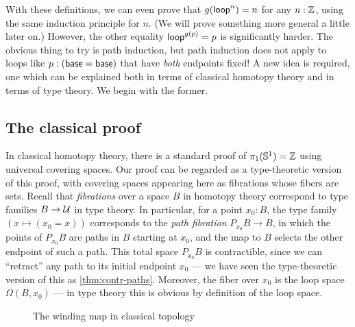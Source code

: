 With these definitions, we can even prove that $g(\mathsf{loop}^n)=n$ for any $n:\mathbb{Z}$, using the same induction principle for $n$.
(We will prove something more general a little later on.)
However, the other equality $\mathsf{loop}^{g(p)}=p$ is significantly harder.
The obvious thing to try is path induction, but path induction does not apply to loops like $p:(\mathsf{base}=\mathsf{base})$ that have \emph{both} endpoints fixed!
A new idea is required, one which can be explained both in terms of classical homotopy theory and in terms of type theory.
We begin with the former.


\subsection{The classical proof}
\label{sec:pi1s1-classical-proof}

In classical homotopy theory, there is a standard proof of $\pi_1(\mathbb{S}^1)=\mathbb{Z}$ using universal covering spaces.
Our proof can be regarded as a type-theoretic version of this proof, with covering spaces appearing here as fibrations whose fibers are sets.
Recall that \emph{fibrations} over a space $B$ in homotopy theory correspond to type families $B\to\mathcal{U}$ in type theory.
In particular, for a point $x_0:B$, the type family $(x\mapsto (x_0=x))$ corresponds to the \emph{path fibration} $P_{x_0} B \to B$, in which the points of $P_{x_0} B$ are paths in $B$ starting at $x_0$, and the map to $B$ selects the other endpoint of such a path.
This total space $P_{x_0} B$ is contractible, since we can ``retract'' any path to its initial endpoint $x_0$ --- we have seen the type-theoretic version of this as \autoref{thm:contr-paths}.
Moreover, the fiber over $x_0$ is the loop space $\Omega(B,x_0)$ --- in type theory this is obvious by definition of the loop space.

\begin{figure}\centering
  \caption{The winding map in classical topology}\label{fig:winding}
\end{figure}

